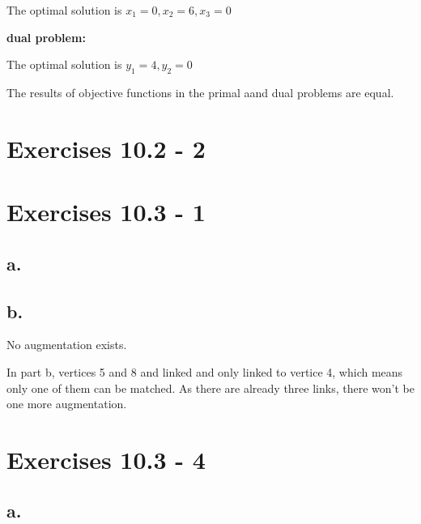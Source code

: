 \documentclass{article}
\begin{document}
The optimal solution is $x_1 = 0, x_2=6, x_3 = 0$


\textbf{dual problem:}

\bigbreak

\bigbreak

\bigbreak

\bigbreak

\bigbreak

\bigbreak

\bigbreak


The optimal solution is $y_1 = 4, y_2 = 0$

The results of objective functions in the primal aand dual problems are equal. 

\section{Exercises 10.2 - 2}

\clearpage

\section{Exercises 10.3 - 1}

\subsection*{a.}

\bigbreak

\bigbreak

\bigbreak

\bigbreak

\bigbreak

\subsection*{b.}

No augmentation exists. 

In part b, vertices 5 and 8 and linked and only linked to vertice 4, which means only one of them can be matched. As there are already three links, there won't be one more augmentation.

\section{Exercises 10.3 - 4}

\subsection*{a.}
\end{document}
